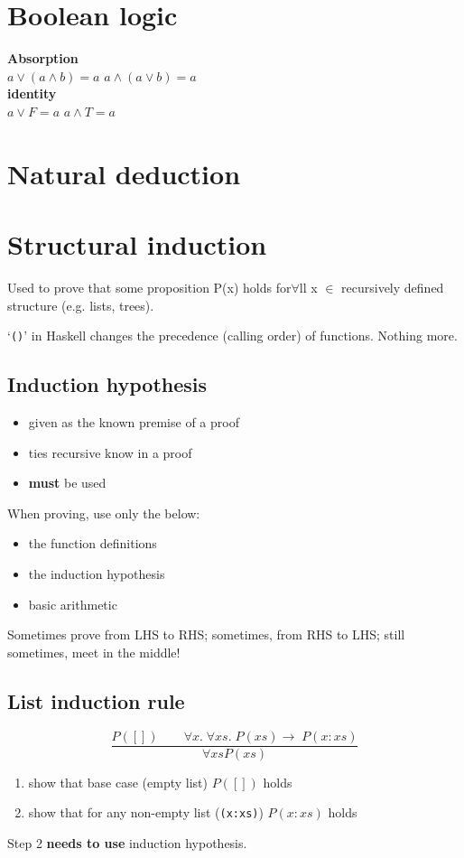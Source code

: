 \documentclass[10pt,a4paper,landscape]{article}
\begin{document}
\pagestyle{empty}
\begin{multicols*}{3}
\section{Boolean logic}
\textbf{Absorption}\\
$a \lor (a \land b) = a$ \hfill $a \land (a \lor b) = a$ \\

\textbf{identity}\\
$a \lor F = a$ \hfill $a \land T = a$
\section{Natural deduction}

\section{Structural induction}
Used to prove that some proposition P(x) holds for$\forall$ll x $\in$ recursively defined structure (e.g. lists, trees).

`\verb|()|' in Haskell changes the precedence (calling order) of functions. Nothing more.
\subsection*{Induction hypothesis}
\begin{itemize}
\item given as the known premise of a proof
\item ties recursive know in a proof
\item \textbf{must} be used
\end{itemize}
When proving, use only the below:
\begin{itemize}
\item the function definitions
\item the induction hypothesis
\item basic arithmetic
\end{itemize}
Sometimes prove from LHS to RHS; sometimes, from RHS to LHS; still sometimes, meet in the middle!
\subsection*{List induction rule}
\begin{displaymath}
\frac{P([])\qquad \forall x.\; \forall xs.\; P(xs) \rightarrow\; P(x:xs)}{\forall xs P(xs)}
\end{displaymath}
\begin{enumerate}
\item show that base case (empty list) $P([])$ holds
\item show that for any non-empty list (\verb|(x:xs)|) $P(x:xs)$ holds
\end{enumerate}
Step 2 \textbf{needs to use} induction hypothesis.


\end{multicols*}
\end{document}

